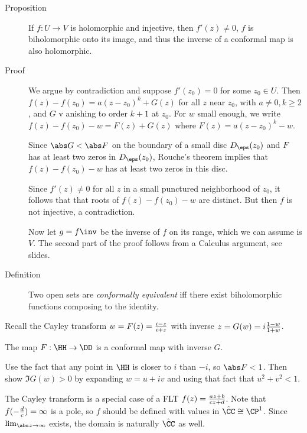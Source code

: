 \begin{description}
\item[Proposition]
If \(f: U\to V\) is holomorphic and injective, then \(f'(z) \neq 0\),
\(f\) is biholomorphic onto its image, and thus the inverse of a
conformal map is also holomorphic.
\item[Proof]
We argue by contradiction and suppose \(f'(z_0) =0\) for some
\(z_0 \in U\). Then \(f(z) - f(z_0) = a(z-z_0)^k + G(z)\) for all \(z\)
near \(z_0\), with \(a\neq 0, k \geq 2\), and \(G\) v anishing to order
\(k+1\) at \(z_0\). For \(w\) small enough, we write
\(f(z) - f(z_0) - w = F(z) + G(z)\) where \(F(z) = a(z-z_0)^k - w\).

\hfill\break

Since \(\abs G < \abs F\) on the boundary of a small disc
\(D_\eps(z_0)\) and \(F\) has at least two zeros in \(D_\eps(z_0)\),
Rouche's theorem implies that \(f(z) - f(z_0) - w\) has at least two
zeros in this disc.

\hfill\break

Since \(f'(z) \neq 0\) for all \(z\) in a small punctured neighborhood
of \(z_0\), it follows that that roots of \(f(z) - f(z_0) - w\) are
distinct. But then \(f\) is not injective, a contradiction.

\hfill\break

Now let \(g = f\inv\) be the inverse of \(f\) on its range, which we can
assume is \(V\). The second part of the proof follows from a Calculus
argument, see slides.
\item[Definition]
Two open sets are \emph{conformally equivalent} iff there exist
biholomorphic functions composing to the identity.
\end{description}

Recall the Cayley transform \(w = F(z) = {i - z \over i + z}\) with
inverse \(z = G(w) = i {1-w \over 1 + w}\).

\begin{description}
\tightlist
\item[Theorem]
The map \(F: \HH \to \DD\) is a conformal map with inverse \(G\).
\item[Proof (Sketch)]
Use the fact that any point in \(\HH\) is closer to \(i\) than \(-i\),
so \(\abs F < 1\). Then show \(\Im G(w) > 0\) by expanding
\(w = u + iv\) and using that fact that \(u^2 + v^2 < 1\).
\end{description}

The Cayley transform is a special case of a FLT
\(f(z) = {az + b \over cz + d}\). Note that \(f(-{d \over c}) = \infty\)
is a pole, so \(f\) should be defined with values in
\(\hat \CC \cong \CP^1\). Since \(\lim_{\abs z \to \infty}\) exists, the
domain is naturally \(\hat \CC\) as well.

